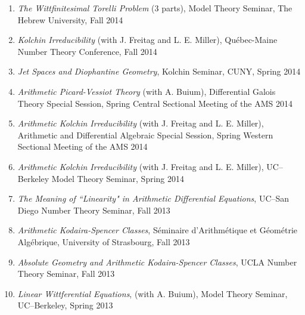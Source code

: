 \documentclass[a4paper,10pt]{article}
\begin{document}
\begin{enumerate}
	\item \emph{The Wittfinitesimal Torelli Problem} (3 parts), Model Theory Seminar, The Hebrew University, Fall 2014
	\item \emph{Kolchin Irreducibility} (with J. Freitag and L. E. Miller),
	Qu\'{e}bec-Maine Number Theory Conference, Fall 2014
	\item \emph{Jet Spaces and Diophantine Geometry},
	Kolchin Seminar, CUNY, Spring 2014
	\item \emph{Arithmetic Picard-Vessiot Theory} (with A. Buium),
	Differential Galois Theory Special Session, Spring Central Sectional Meeting of the AMS 2014
	\item \emph{Arithmetic Kolchin Irreducibility} (with J. Freitag and L. E. Miller), 
	Arithmetic and Differential Algebraic Special Session, Spring Western Sectional Meeting of the AMS 2014
	\item \emph{Arithmetic Kolchin Irreducibility} (with J. Freitag and L. E. Miller), UC--Berkeley Model Theory Seminar, Spring 2014
	\item \emph{The Meaning of ``Linearity" in Arithmetic Differential Equations}, UC--San Diego Number Theory Seminar, Fall 2013
	\item \emph{Arithmetic Kodaira-Spencer Classes}, S\'eminaire d'Arithm\'etique et G\'eom\'etrie Alg\'ebrique, University of Strasbourg, Fall 2013
	\item \emph{Absolute Geometry and Arithmetic Kodaira-Spencer Classes}, UCLA Number Theory Seminar, Fall 2013
	\item \emph{Linear Wittferential Equations}, (with A. Buium), Model Theory Seminar, UC--Berkeley, Spring 2013

\end{enumerate}
\end{document}
